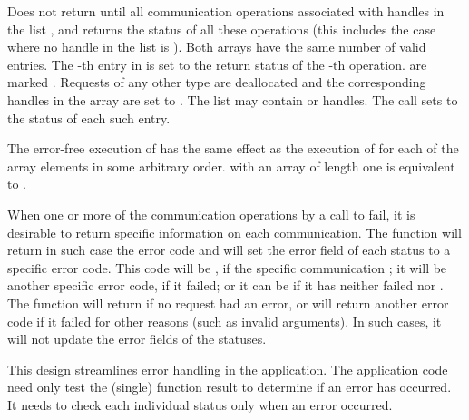 Does not return until 
all communication operations associated with  handles
in the list , and returns the status of all these operations
(this includes the case where no handle in the list is ).
Both arrays have the same number of valid entries.  The -th entry in
 is set to the return status of the
-th operation.
  are marked .  Requests of any other type
are
deallocated and the corresponding handles in the array are set to
.
The list may contain  or  handles.
The call sets to  the status of each such entry.

The error-free execution of
has the same effect as the execution of
for each of the array elements
in some arbitrary order.
 with an array of length one
is equivalent to .

When one or more of the communication operations  by a
call to  fail, it is
desirable to return specific information on each
communication.  The function  will return in such
case the error code  and will set the
error field of each status to a specific error code.  This code will be
, if the specific communication ; it will
be another specific error code, if it failed;
or it can be  if it has neither failed nor .
The function  will return  if no request
had an error,
or will return another error code if it failed
for other reasons (such as invalid arguments).  In such cases, it will
not update the error fields of the statuses.

\begin{rationale}
This design streamlines error handling in the application.
The application code need only test the (single) function result to
determine if an error has occurred.  It needs to check each individual
status only when an error occurred.
\end{rationale}

